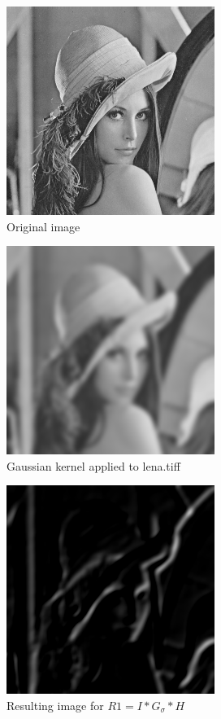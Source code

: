\documentclass[12pt,a4paper]{article}
\begin{document}
\begin{figure}[h]
	\begin{center}
		\includegraphics[scale=1]{./images/lena.png}
		\caption{Original image} 
	\end{center}
\end{figure}

\begin{figure}[h]
	\begin{center}
		\includegraphics[scale=1]{./images/imG.png}
		\caption{Gaussian kernel applied to lena.tiff} 
	\end{center}
\end{figure}

\begin{figure}[h]
	\begin{center}
		\includegraphics[scale=1]{./images/imR1}
		\caption{Resulting image for $R1 = I * G_{\sigma} * H$} 
	\end{center}
\end{figure}
\end{document}
